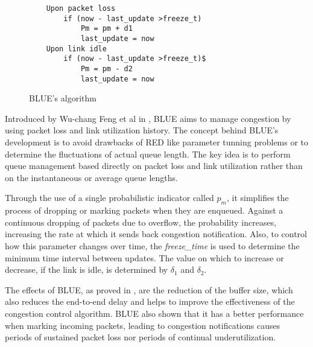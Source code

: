 \begin{wrapfigure}{r}{0.5\textwidth}
    \centering
	\begin{verbatim}
	Upon packet loss
	    if (now - last_update >freeze_t)
	        Pm = pm + d1
	        last_update = now
	Upon link idle
	    if (now - last_update >freeze_t)$
	        Pm = pm - d2
	        last_update = now
  	\end{verbatim}
    \caption{BLUE's algorithm}
    \label{fig:BLUEAlg}
\end{wrapfigure}

Introduced by Wu-chang Feng et al in \cite{FengBLUEAQM}, BLUE aims to manage
congestion by using packet loss and link utilization history. The concept
behind BLUE's development is to avoid drawbacks of RED like parameter tunning
problems or to determine the fluctuations of actual queue length. The key idea
is to perform queue management based directly on packet loss and link
utilization rather than on the instantaneous or average queue lengths.

Through the use of a single probabilistic indicator called $p_m$, it
simplifies the process of dropping or marking packets when they are enqueued.
Against a continuous dropping of packets due to overflow, the probability
increases, increasing the rate at which it sends back congestion notification.
Also, to control how this parameter changes over time, the
\textit{freeze\_time} is used to determine the minimum time interval between
updates.  The value on which to increase or decrease, if the link is idle, is
determined by $\delta_1$ and $\delta_2$.

The effects of BLUE, as proved in \cite{FengBLUEAQM}, are the reduction of the
buffer size, which also reduces the end-to-end delay and helps to improve the
effectiveness of the congestion control algorithm. BLUE also shown that it
has a better performance when marking incoming packets, leading to congestion
notifications causes periods of sustained packet loss nor periods of continual
underutilization.
